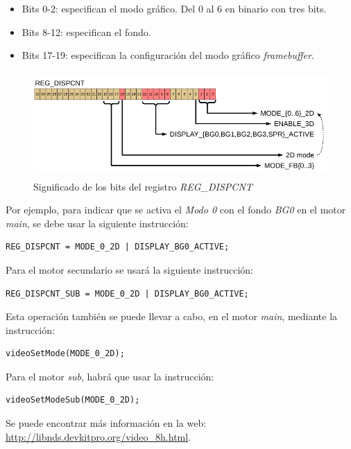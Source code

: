 \begin{itemize}
	\item Bits 0-2: especifican el modo gráfico. Del 0 al 6 en binario con tres bits.
	\item Bits 8-12: especifican el fondo.
	\item Bits 17-19: especifican la configuración del modo gráfico \textit{framebuffer}.
\end{itemize}

\begin{figure}[t]
\centering
\includegraphics[height=4cm]{Figuras/C5/c5_reg_dispcnt3.png}
\caption{Significado de los bits del registro \textit{REG\_DISPCNT}}
\label{fig_c5_reg_dispcnt3}
\end{figure}

Por ejemplo, para indicar que se activa el \textit{Modo 0} con el fondo \textit{BG0} en el motor \textit{main}, se debe usar la siguiente instrucción:

\begin{verbatim}
REG_DISPCNT = MODE_0_2D | DISPLAY_BG0_ACTIVE;
\end{verbatim}

Para el motor secundario se usará la siguiente instrucción:

\begin{verbatim}
REG_DISPCNT_SUB = MODE_0_2D | DISPLAY_BG0_ACTIVE;
\end{verbatim}

Esta operación también se puede llevar a cabo, en el motor \textit{main}, mediante la instrucción:
\begin{verbatim}
videoSetMode(MODE_0_2D);
\end{verbatim}

Para el motor \textit{sub}, habrá que usar la instrucción:
\begin{verbatim}
videoSetModeSub(MODE_0_2D);
\end{verbatim}

Se puede encontrar más información en la web: \url{http://libnds.devkitpro.org/video_8h.html}. 


